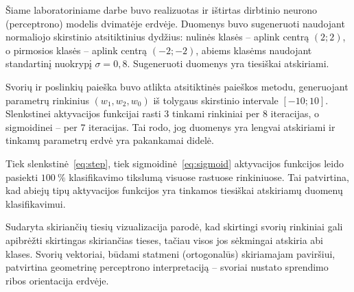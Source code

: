 
Šiame laboratoriniame darbe buvo realizuotas ir ištirtas dirbtinio neurono (perceptrono) modelis dvimatėje erdvėje. Duomenys buvo sugeneruoti naudojant normaliojo skirstinio atsitiktinius dydžius: nulinės klasės – aplink centrą $(2;2)$, o pirmosios klasės – aplink centrą $(-2;-2)$, abiems klasėms naudojant standartinį nuokrypį $\sigma = 0{,}8$. Sugeneruoti duomenys yra tiesiškai atskiriami.

Svorių ir poslinkių paieška buvo atlikta atsitiktinės paieškos metodu, generuojant parametrų rinkinius $(w_1, w_2, w_0)$ iš tolygaus skirstinio intervale $[-10;10]$. Slenkstinei aktyvacijos funkcijai rasti 3 tinkami rinkiniai per 8 iteracijas, o sigmoidinei – per 7 iteracijas. Tai rodo, jog duomenys yra lengvai atskiriami ir tinkamų parametrų erdvė yra pakankamai didelė.

Tiek slenkstinė~\eqref{eq:step}, tiek sigmoidinė~\eqref{eq:sigmoid} aktyvacijos funkcijos leido pasiekti $100\ \%$ klasifikavimo tikslumą visuose rastuose rinkiniuose. Tai patvirtina, kad abiejų tipų aktyvacijos funkcijos yra tinkamos tiesiškai atskiriamų duomenų klasifikavimui.

Sudaryta skiriančių tiesių vizualizacija parodė, kad skirtingi svorių rinkiniai gali apibrėžti skirtingas skiriančias tieses, tačiau visos jos sėkmingai atskiria abi klases. Svorių vektoriai, būdami statmeni (ortogonalūs) skiriamajam paviršiui, patvirtina geometrinę perceptrono interpretaciją – svoriai nustato sprendimo ribos orientacija erdvėje.
